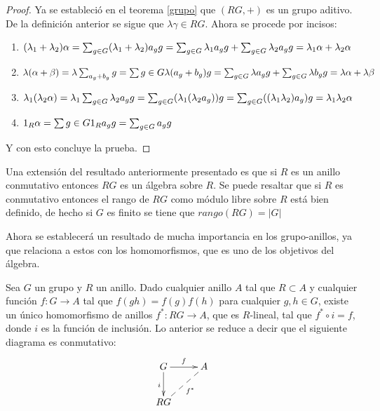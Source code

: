 \begin{proof}
Ya se estableció en el teorema \ref{grupo} que $(RG,+)$ es un grupo aditivo. De la definición anterior se sigue que $\lambda\gamma \in RG$. Ahora se procede por incisos: 
\begin{enumerate}
\item $(\lambda_1+\lambda_2)\alpha = \sum_{g \in G} (\lambda_1+\lambda_2)a_gg = \sum_{g \in G} \lambda_1 a_{g} g + \sum_{g \in G} \lambda_2 a_{g} g = \lambda_1\alpha + \lambda_2\alpha$
\item $\lambda(\alpha + \beta) = \lambda\sum_{a_g+b_g}g = \sum{g \in G}\lambda(a_g+b_g)g = \sum_{g \in G} \lambda a_{g} g + \sum_{g \in G} \lambda b_{g} g = \lambda\alpha + \lambda\beta$
\item  $\lambda_1(\lambda_2\alpha) = \lambda_1\sum_{g \in G} \lambda_2 a_{g} g = \sum_{g\in G}(\lambda_1(\lambda_2 a_g))g = \sum_{g\in G}((\lambda_1\lambda_2)a_g)g = \lambda_1\lambda_2\alpha$
\item $1_R\alpha = \sum{g \in G}1_Ra_gg = \sum_{g \in G} a_{g} g$
\end{enumerate}
Y con esto concluye la prueba. \qedhere

\end{proof}

Una extensión del resultado anteriormente presentado es que si $R$ es un anillo conmutativo entonces $RG$ es un álgebra sobre $R$. Se puede resaltar que si $R$ es conmutativo  entonces el rango de $RG$ como módulo libre sobre $R$ está bien definido, de hecho si $G$ es finito se tiene que $rango(RG) = |G|$

Ahora se establecerá un resultado de mucha importancia en los grupo-anillos, ya que relaciona a estos con los homomorfismos, que es uno de los objetivos del álgebra.

\begin{proposicion}\label{up}
Sea $G$ un grupo y $R$ un anillo. Dado cualquier anillo $A$ tal que $R \subset A$ y cualquier función $f \colon G \to A$ tal que $f(gh) = f(g)f(h)$ para cualquier $g,h \in G$, existe un único homomorfismo de anillos $f^* \colon  RG \to A$, que es $R$-lineal, tal que $f^*\circ i = f$, donde $i$ es la función de inclusión. Lo anterior se reduce a decir que el siguiente diagrama es conmutativo:
\[\xymatrix { G \ar[r]^f 
\ar[d]_i & A\\
RG \ar@{--}[ru]_{f^*} & }\]
\end{proposicion}

